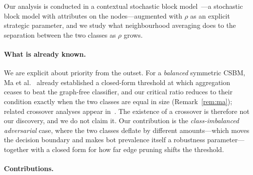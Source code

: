 \documentclass[onecolumn,pdflatex,sn-basic,Numbered]{sn-jnl}
\theoremstyle{thmstyleone}
\theoremstyle{thmstylethree}
\begin{document}
Our analysis is conducted in a contextual stochastic block
model~\citep{deshpande2018contextual}---a stochastic block model with attributes on
the nodes---augmented with $\rho$ as an explicit strategic parameter, and we study
what neighbourhood averaging does to the separation between the two classes as $\rho$
grows.

\paragraph{What is already known.} We are explicit about priority from the outset.
For a \emph{balanced} symmetric CSBM, Ma et al.~\citep[Thm.~2]{ma2022homophily}
already established a closed-form threshold at which aggregation ceases to beat the
graph-free classifier, and our critical ratio reduces to their condition exactly when
the two classes are equal in size (Remark~\ref{rem:ma}); related crossover analyses
appear in~\citep{luan2023when,mao2023demystifying,fountoulakis2023graph}. The
existence of a crossover is therefore not our discovery, and we do not claim it.
Our contribution is the \emph{class-imbalanced adversarial} case, where the two
classes deflate by different amounts---which moves the decision boundary and makes
bot prevalence itself a robustness parameter---together with a closed form for how
far edge pruning shifts the threshold.

\paragraph{Contributions.}
\end{document}
